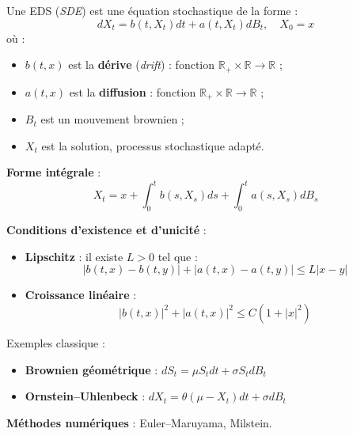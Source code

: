 \begin{f}
	
	Une EDS (\emph{SDE}) est une équation stochastique de la forme :
	\[
	dX_t = b(t, X_t) dt + a(t, X_t) dB_t, \quad X_0 = x
	\]
	où :
	\begin{itemize}
		\item \(b(t,x)\) est la \textbf{dérive} (\emph{drift}) : fonction \(\mathbb{R}_+ \times \mathbb{R} \to \mathbb{R}\) ;
		\item \(a(t,x)\) est la \textbf{diffusion} : fonction \(\mathbb{R}_+ \times \mathbb{R} \to \mathbb{R}\) ;
		\item \(B_t\) est un mouvement brownien ;
		\item \(X_t\) est la solution, processus stochastique adapté.
	\end{itemize}
	
	\textbf{Forme intégrale} :
	\[
	X_t = x + \int_0^t b(s, X_s) ds + \int_0^t a(s, X_s) dB_s
	\]
	
	\textbf{Conditions d’existence et d’unicité} :
	\begin{itemize}
		\item \textbf{Lipschitz} : il existe \(L > 0\) tel que :
		\[
		|b(t,x) - b(t,y)| + |a(t,x) - a(t,y)| \leq L |x - y|
		\]
		\item \textbf{Croissance linéaire} :
		\[
		|b(t,x)|^2 + |a(t,x)|^2 \leq C(1 + |x|^2)
		\]
	\end{itemize}
	
Exemples classique :
	\begin{itemize}
		\item \textbf{Brownien géométrique} : \(dS_t = \mu S_t dt + \sigma S_t dB_t\)
		\item \textbf{Ornstein–Uhlenbeck} : \(dX_t = \theta(\mu - X_t) dt + \sigma dB_t\)
	\end{itemize}
	
	\textbf{Méthodes numériques} : Euler–Maruyama, Milstein.
	
\end{f}

